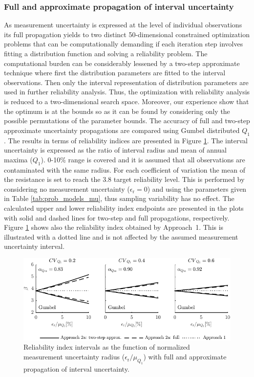 \subsubsection{Full and approximate propagation of interval uncertainty}
As measurement uncertainty is expressed at the level of individual observations its full propagation yields to two distinct 50-dimensional constrained optimization problems that can be computationally demanding if each iteration step involves fitting a distribution function and solving a reliability problem. The computational burden can be considerably lessened by a two-step approximate technique where first the distribution parameters are fitted to the interval observations. Then only the interval representation of distribution parameters are used in further reliability analysis. Thus, the optimization with reliability analysis is reduced to a two-dimensional search space. Moreover, our experience show that the optimum is at the bounds so as it can be found by considering only the possible permutations of the parameter bounds.
The accuracy of full and two-step approximate uncertainty propagations are compared using Gumbel distributed $Q_1$. The results in terms of reliability indices are presented in Figure \ref{fig:beta_interval_full_approx}. The interval uncertainty is expressed as the ratio of interval radius and mean of annual maxima ($Q_1$). 0-10\% range is covered and it is assumed that all observations are contaminated with the same radius. For each coefficient of variation the mean of the resistance is set to reach the 3.8 target reliability level. This is performed by considering no measurement uncertainty ($\epsilon_\mathrm{r} = 0$) and using the parameters given in Table \ref{tab:prob_models_mu}, thus sampling variability has no effect. The calculated upper and lower reliability index endpoints are presented in the plots with solid and dashed lines for two-step and full propagations, respectively. Figure \ref{fig:beta_interval_full_approx} shows also the reliability index obtained by Approach~1. This is illustrated with a dotted line and is not affected by the assumed measurement uncertainty interval.
\begin{figure}[htbp!] 
	\centering    
	\includegraphics[]{beta_interval_full_approx.pdf}
	\caption{Reliability index intervals as the function of normalized measurement uncertainty radius ($\epsilon_\mathrm{r}/\mu_{Q_1}$) with full and approximate propagation of interval uncertainty.}
	\label{fig:beta_interval_full_approx}
\end{figure}

